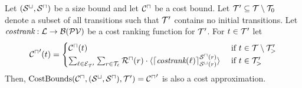 \begin{theorem}[CostBounds]
  Let ${({\mathcal{S}^\sqcup}, {\mathcal{S}^\sqcap})}$ be a size bound and let ${\mathcal{C}^\sqcap}$ be a cost bound.
  Let $\mathcal{T}' \subseteq \mathcal{T} \setminus \mathcal{T}_0$ denote a subset of all transitions such that $\mathcal{T}'$ contains no initial transitions.
  Let $\emph{costrank}: \mathcal{L} \rightarrow \mathcal{B}(\mathcal{PV})$ be a cost ranking function for $\mathcal{T}'$.
  For $t \in \mathcal{T}'$ let
  \[ {\mathcal{C}^\sqcap}'(t) = 
  \begin{cases}
    {\mathcal{C}^\sqcap}(t) & \text{ if } t \in \mathcal{T} \setminus \mathcal{T}'_> \\
    \sum_{\ell \in \mathcal{E}_{\mathcal{T}'}} \sum_{r \in \mathcal{T}_\ell} {\mathcal{R}^\sqcap}(r) \cdot \langle\lceil \emph{costrank}(\ell) \rceil^{{\mathcal{S}^\sqcap}(r)}_{{\mathcal{S}^\sqcup}(r)}\rangle & \text{ if } t \in \mathcal{T}'_>
  \end{cases}
  \]
  Then, $\text{CostBounds}({\mathcal{C}^\sqcap}, {({\mathcal{S}^\sqcup}, {\mathcal{S}^\sqcap})}, \mathcal{T}') = {\mathcal{C}^\sqcap}'$ is also a cost approximation.
\end{theorem}

